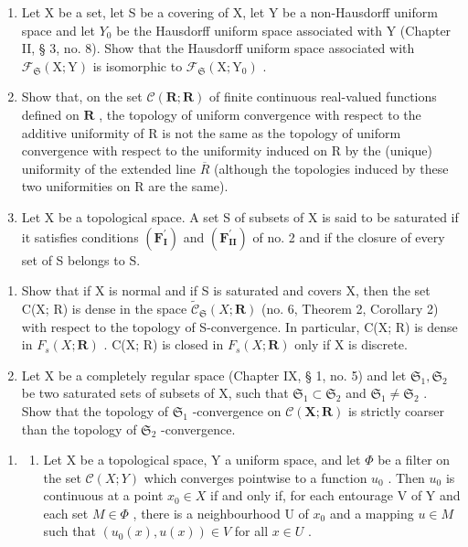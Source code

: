 \begin{enumerate}
\def\labelenumi{\arabic{enumi})}
\setcounter{enumi}{2}
\item
  Let X be a set, let S be a covering of X, let Y be a non-Hausdorff uniform space and let \(Y_{0}\) be the Hausdorff uniform space associated with Y (Chapter II, § 3, no. 8). Show that the Hausdorff uniform space associated with \(\mathcal{F}_{\mathfrak{S}}(\mathrm{X};\mathrm{Y})\) is isomorphic to \(\mathcal{F}_{\mathfrak{S}}(\mathrm{X};\mathrm{Y}_{0})\) .
\item
  Show that, on the set \(\mathcal{C}(\mathbf{R};\mathbf{R})\) of finite continuous real-valued functions defined on \(\mathbf{R}\) , the topology of uniform convergence with respect to the additive uniformity of R is not the same as the topology of uniform convergence with respect to the uniformity induced on R by the (unique) uniformity of the extended line \(\overline{R}\) (although the topologies induced by these two uniformities on R are the same).
\item
  Let X be a topological space. A set S of subsets of X is said to be saturated if it satisfies conditions \((\mathbf{F}_{\mathbf{I}}^{\prime})\) and \((\mathbf{F}_{\mathbf{II}}^{\prime})\) of no. 2 and if the closure of every set of S belongs to S.
\end{enumerate}

\begin{enumerate}
\def\labelenumi{\alph{enumi})}
\item
  Show that if X is normal and if S is saturated and covers X, then the set C(X; R) is dense in the space \(\tilde{\mathcal{C}}_{\mathfrak{S}}(X; \mathbf{R})\) (no. 6, Theorem 2, Corollary 2) with respect to the topology of S-convergence. In particular, C(X; R) is dense in \(F_{s}(X; \mathbf{R})\) . C(X; R) is closed in \(F_{s}(X; \mathbf{R})\) only if X is discrete.
\item
  Let X be a completely regular space (Chapter IX, § 1, no. 5) and let \(\mathfrak{S}_1, \mathfrak{S}_2\) be two saturated sets of subsets of X, such that \(\mathfrak{S}_1 \subset \mathfrak{S}_2\) and \(\mathfrak{S}_1 \neq \mathfrak{S}_2\) . Show that the topology of \(\mathfrak{S}_1\) -convergence on \(\mathcal{C}(\mathbf{X}; \mathbf{R})\) is strictly coarser than the topology of \(\mathfrak{S}_2\) -convergence.
\end{enumerate}

\begin{enumerate}
\def\labelenumi{\arabic{enumi})}
\setcounter{enumi}{5}
\tightlist
\item
  \begin{enumerate}
  \def\labelenumii{\alph{enumii})}
  \tightlist
  \item
    Let X be a topological space, Y a uniform space, and let \(\Phi\) be a filter on the set \(\mathcal{C}(X;Y)\) which converges pointwise to a function \(u_{0}\) . Then \(u_{0}\) is continuous at a point \(x_{0}\in X\) if and only if, for each entourage V of Y and each set \(M\in\Phi\) , there is a neighbourhood U of \(x_{0}\) and a mapping \(u\in M\) such that \((u_{0}(x),u(x))\in V\) for all \(x\in U\) .
  \end{enumerate}
\end{enumerate}

